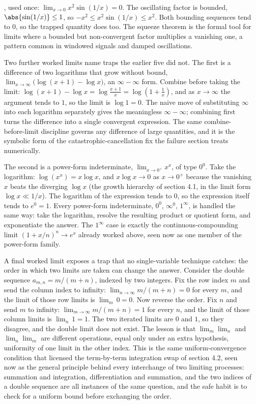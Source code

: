 , used once: $\lim_{x \to 0} x^{2}
\sin(1/x) = 0$. The oscillating factor is bounded, $\abs{\sin(1/x)}
\leq 1$, so $-x^{2} \leq x^{2} \sin(1/x) \leq x^{2}$. Both bounding
sequences tend to $0$, so the trapped quantity does too. The squeeze
theorem is the formal tool for limits where a bounded but
non-convergent factor multiplies a vanishing one, a pattern common in
windowed signals and damped oscillations.

Two further worked limits name traps the earlier five did not. The
first is a difference of two logarithms that grow without bound,
$\lim_{x \to \infty}\bigl(\log(x + 1) - \log x\bigr)$, an $\infty -
\infty$ form. Combine before taking the limit: $\log(x+1) - \log x =
\log\!\frac{x+1}{x} = \log\!\left(1 + \frac{1}{x}\right)$, and as $x \to
\infty$ the argument tends to $1$, so the limit is $\log 1 = 0$. The
naive move of substituting $\infty$ into each logarithm separately gives
the meaningless $\infty - \infty$; combining first turns the difference
into a single convergent expression. The same combine-before-limit
discipline governs any difference of large quantities, and it is the
symbolic form of the catastrophic-cancellation fix the failure section
treats numerically.

The second is a power-form indeterminate, $\lim_{x \to 0^{+}} x^{x}$, of
type $0^{0}$. Take the logarithm: $\log(x^{x}) = x \log x$, and $x \log
x \to 0$ as $x \to 0^{+}$ because the vanishing $x$ beats the diverging
$\log x$ (the growth hierarchy of section 4.1, in the limit form $\log x
\ll 1/x$). The logarithm of the expression tends to $0$, so the
expression itself tends to $e^{0} = 1$. Every power-form indeterminate,
$0^{0}$, $\infty^{0}$, $1^{\infty}$, is handled the same way: take the
logarithm, resolve the resulting product or quotient form, and
exponentiate the answer. The $1^{\infty}$ case is exactly the
continuous-compounding limit $(1 + x/n)^{n} \to e^{x}$ already worked
above, seen now as one member of the power-form family.

A final worked limit exposes a trap that no single-variable technique
catches: the order in which two limits are taken can change the answer.
Consider the double sequence $a_{m,n} = m/(m + n)$, indexed by two
integers. Fix the row index $m$ and send the column index to infinity:
$\lim_{n \to \infty} m/(m + n) = 0$ for every $m$, and the limit of those
row limits is $\lim_{m}\, 0 = 0$. Now reverse the order. Fix $n$ and send
$m$ to infinity: $\lim_{m \to \infty} m/(m + n) = 1$ for every $n$, and
the limit of those column limits is $\lim_{n}\, 1 = 1$. The two iterated
limits are $0$ and $1$, so they disagree, and the double limit does not
exist. The lesson is that $\lim_{m}\lim_{n}$ and $\lim_{n}\lim_{m}$ are
different operations, equal only under an extra hypothesis, uniformity of
one limit in the other index. This is the same uniform-convergence
condition that licensed the term-by-term integration swap of section 4.2,
seen now as the general principle behind every interchange of two
limiting processes: summation and integration, differentiation and
summation, and the two indices of a double sequence are all instances of
the same question, and the safe habit is to check for a uniform bound
before exchanging the order.

